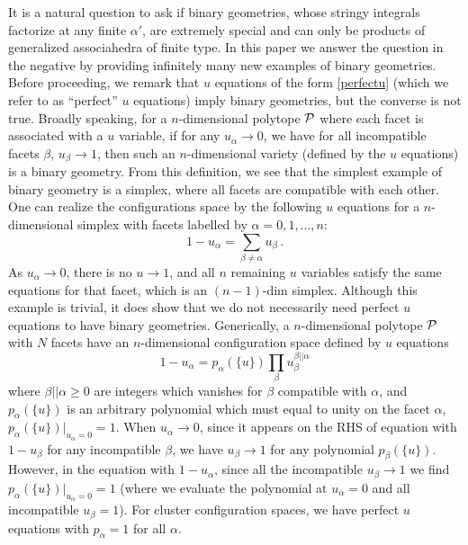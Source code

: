 \documentclass[hidelinks,12pt]{article}
\newcommand{\be}{\begin{equation}}
\newcommand{\ee}{\end{equation}}
\def\be{\begin{equation}}
\def\ee{\end{equation}}
\begin{document}
It is a natural question to ask if binary geometries, whose stringy integrals factorize at any finite $\alpha'$, are extremely special and can only be products of generalized associahedra of finite type. In this paper we answer the question in the negative by providing infinitely many new examples of binary geometries. Before proceeding, we remark that $u$ equations of the form \eqref{perfectu} (which we refer to as ``perfect'' $u$ equations) imply binary geometries, but the converse is not true. Broadly speaking, for a $n$-dimensional polytope ${\cal P}$ where each facet is associated with a $u$ variable, if for any $u_\alpha\to 0$, we have for all incompatible facets $\beta$, $u_\beta \to 1$, then such an $n$-dimensional variety (defined by the $u$ equations) is a binary geometry. From this definition, we see that the simplest example of binary geometry is a simplex, where all facets are compatible with each other. One can realize the configurations space by the following $u$ equations for a $n$-dimensional simplex with facets labelled by $\alpha=0,1,\dots, n$:
\[
1-u_\alpha=\sum_{\beta \neq \alpha} u_\beta\,.
\] 
As $u_\alpha\to 0$, there is no $u\to 1$, and all $n$ remaining $u$ variables satisfy the same equations for that facet, which is an $(n{-}1)$-dim simplex. Although this example is trivial, it does show that we do not necessarily need perfect $u$ equations to have binary geometries. Generically,  a $n$-dimensional polytope ${\cal P}$ with $N$ facets have an $n$-dimensional configuration space defined by $u$ equations
\be\label{genueq}
1-u_\alpha=p_\alpha(\{u\}) \prod_\beta u_\beta^{\beta||\alpha} 
\ee
where $\beta ||\alpha \geq 0$ are integers which vanishes for $\beta$ compatible with $\alpha$, and $p_\alpha(\{u\})$ is an arbitrary polynomial which must equal to unity on the facet $\alpha$, $p_\alpha (\{u\})|_{u_\alpha=0}=1$. When $u_\alpha \to 0$, since it appears on the RHS of equation with $1-u_\beta$ for any incompatible $\beta$, we have $u_\beta\to 1$ for any polynomial $p_\beta (\{u\})$. However, in the equation with $1-u_\alpha$, since all the incompatible $u_\beta \to 1$ we find $p_\alpha (\{u\})|_{u_\alpha=0}=1$ (where we evaluate the polynomial at $u_\alpha=0$ and all incompatible $u_\beta=1$). For cluster configuration spaces, we have perfect $u$ equations with $p_\alpha=1$ for all $\alpha$.
\end{document}
